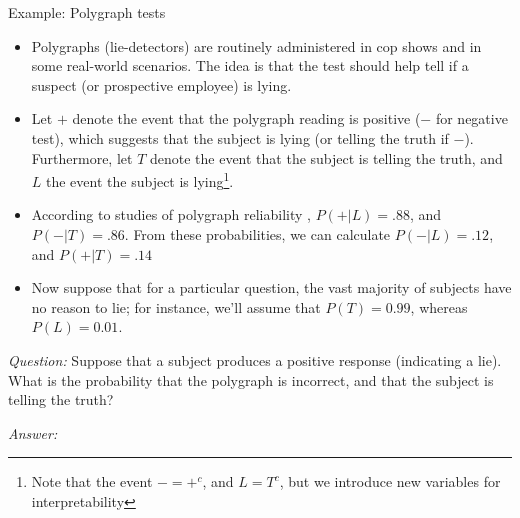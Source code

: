 \begin{frame}[allowframebreaks]{Example: Polygraph tests}

    \begin{itemize}
      \item Polygraphs (lie-detectors) are routinely administered in cop shows and in some real-world scenarios.
    The idea is that the test should help tell if a suspect (or prospective employee) is lying.

      \item Let $+$ denote the event that the polygraph reading is positive ($-$ for negative test), which suggests that the subject is lying (or telling the truth if $-$). Furthermore, let $T$ denote the event that the subject is telling the truth, and $L$ the event the subject is lying\footnote{Note that the event $- = +^c$, and $L = T^c$, but we introduce new variables for interpretability}.

    \framebreak

      \item According to studies of polygraph reliability \citep{gastwirth87}, $P(+ | L) = .88$, and $P(-|T) = .86$.
    From these probabilities, we can calculate $P(- | L) = .12$, and $P(+ | T) = .14$

      \item Now suppose that for a particular question, the vast majority of subjects have no reason to lie; for instance, we'll assume that $P(T) = 0.99$, whereas $P(L) = 0.01$.
      \end{itemize}


    \emph{Question:} Suppose that a subject produces a positive response (indicating a lie). What is the probability that the polygraph is incorrect, and that the subject is telling the truth?

    \framebreak

    \emph{Answer:}


\end{frame}
  
